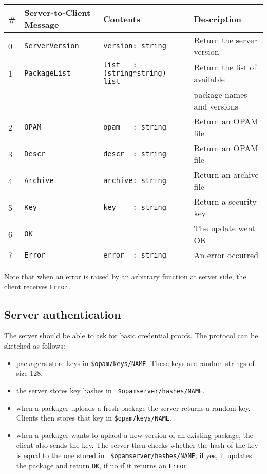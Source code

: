 \documentclass[a4paper,11pt]{article}
\begin{document}
\begin{itemize}
{\small
\begin{tabular}{|l|l|l|l|}
\hline
\# & Server-to-Client Message & Contents & Description \\
\hline
\hline
0 & \verb+ServerVersion+ & \verb+version: string+  & Return the server version \\
\hline
1 & \verb+PackageList+  & \verb+list   : (string*string) list+ & Return the list of available \\
  &                     &                                      & package names and versions \\
\hline
2 & \verb+OPAM+         & \verb+opam   : string+ & Return an OPAM file \\
\hline
3 & \verb+Descr+        & \verb+descr  : string+ & Return an OPAM file \\
\hline
4 & \verb+Archive+      & \verb+archive: string+ & Return an archive file \\
\hline
5 & \verb+Key+          & \verb+key    : string+ & Return a security key \\
\hline
6 & \verb+OK+           & --                     & The update went OK \\
\hline
7 & \verb+Error+        & \verb+error  : string+ & An error occurred \\
\hline
\end{tabular}
}

\end{itemize}

Note that when an error is raised by an arbitrary function
 at server side, the client receives \verb|Error|.

\subsection{Server authentication}

The server should be able to ask for basic credential proofs. The
protocol can be sketched as follows:

\begin{itemize}

\item packagers store keys in {\tt \$opam/keys/NAME}. These keys are
  random strings of size 128.

\item the server stores key hashes in {\tt
  \$opamserver/hashes/NAME}.

\item when a packager uploads a fresh package the server returns a
  random key. Clients then stores that key in {\tt \$opam/keys/NAME}.

\item when a packager wants to uplaod a new version of an existing
  package, the client also sends the key. The server then checks
  whether the hash of the key is equal to the one stored in {\tt
    \$opamserver/hashes/NAME}; if yes, it updates the
  package and return {\tt OK}, if no if it returns an {\tt Error}.

\end{itemize}
\end{document}
